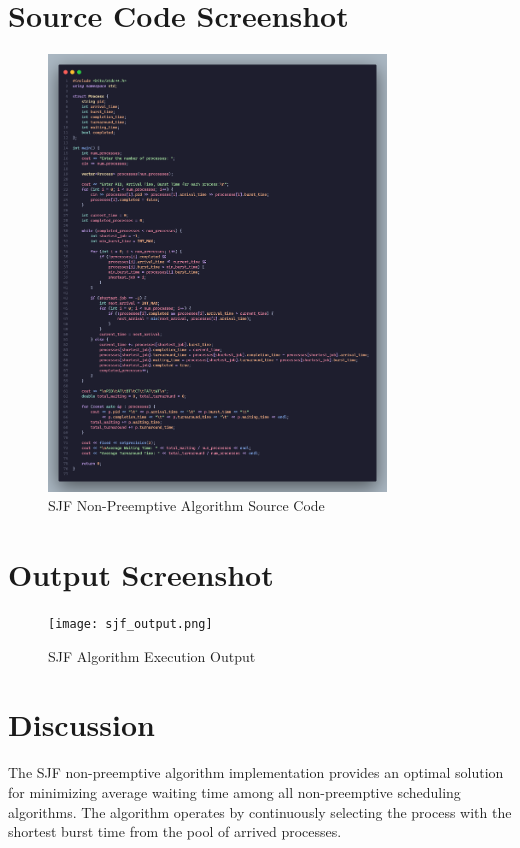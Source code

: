 \documentclass[12pt,a4paper]{article}
\begin{document}
\section{Source Code Screenshot}
\begin{figure}[H]
    \centering
    \includegraphics[width=0.8\textwidth]{code.png}
    \caption{SJF Non-Preemptive Algorithm Source Code}
    \label{fig:sjf_source}
\end{figure}

\section{Output Screenshot}
\begin{figure}[H]
    \centering
    \texttt{[image: sjf\_output.png]}
    \caption{SJF Algorithm Execution Output}
    \label{fig:sjf_output}
\end{figure}

\section{Discussion}
The SJF non-preemptive algorithm implementation provides an optimal solution for minimizing average waiting time among all non-preemptive scheduling algorithms. The algorithm operates by continuously selecting the process with the shortest burst time from the pool of arrived processes.
\end{document}
